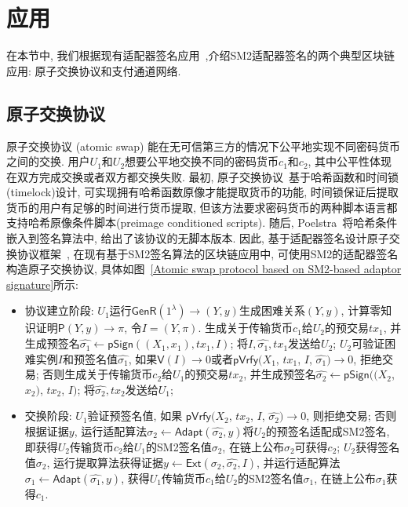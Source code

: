 \documentclass[review]{jcr}
\begin{document}
\section{应用} 

在本节中, 我们根据现有适配器签名应用~\cite{Poelstra2017,MalavoltaMSKM19,EsginEE20,AumayrEEFHMMR20},介绍SM2适配器签名的两个典型区块链应用: 原子交换协议和支付通道网络. 

\subsection{原子交换协议}

原子交换协议 (atomic swap) 能在无可信第三方的情况下公平地实现不同密码货币之间的交换. 用户$U_1$和$U_2$想要公平地交换不同的密码货币$c_1$和$c_2$, 其中公平性体现在双方完成交换或者双方都交换失败. 最初, 原子交换协议~\cite{Nolan2013}基于哈希函数和时间锁(timelock)设计, 可实现拥有哈希函数原像才能提取货币的功能, 时间锁保证后提取货币的用户有足够的时间进行货币提取, 但该方法要求密码货币的两种脚本语言都支持哈希原像条件脚本(preimage conditioned scripts). 随后, Poelstra~\cite{Poelstra2017}将哈希条件嵌入到签名算法中, 给出了该协议的无脚本版本. 因此, 基于适配器签名设计原子交换协议框架~\cite{Nolan2013,Poelstra2017,EsginEE20}, 在现有基于SM2签名算法的区块链应用中, 可使用SM2的适配器签名构造原子交换协议, 具体如图~\ref{Atomic swap protocol based on SM2-based adaptor signature}所示: 

\begin{itemize}

\item 协议建立阶段: $U_1$运行$\mathsf{GenR}(1^\lambda)\rightarrow (Y,y)$生成困难关系$(Y,y)$, 计算零知识证明$\mathsf{P}(Y,y)\rightarrow \pi$, 令$I=(Y,\pi)$. 生成关于传输货币$c_1$给$U_2$的预交易$tx_1$, 并生成预签名$\hat{\sigma_1}\leftarrow \mathsf{pSign}((X_1,x_1), tx_1, I)$; 将$I, \hat{\sigma_1}, tx_1$发送给$U_2$; $U_2$可验证困难实例$I$和预签名值$\hat{\sigma_1}$, 如果$\mathsf{V}(I)\rightarrow 0$或者$\mathsf{pVrfy}$$(X_1$, $tx_1$, $I$, $\hat{\sigma_1})$$\rightarrow 0$, 拒绝交易;  否则生成关于传输货币$c_2$给$U_1$的预交易$tx_2$, 并生成预签名$\hat{\sigma_2}$$\leftarrow$$\mathsf{pSign}$$((X_2$, $x_2)$, $tx_2$, $I)$; 将$\hat{\sigma_2},tx_2$发送给$U_1$;

\item 交换阶段: $U_1$验证预签名值, 如果 $\mathsf{pVrfy}(X_2$, $tx_2$, $I$, $\hat{\sigma_2})$$\rightarrow 0$, 则拒绝交易; 否则根据证据$y$, 运行适配算法$\sigma_2\leftarrow \mathsf{Adapt}(\hat{\sigma_2},y)$将$U_2$的预签名适配成SM2签名, 即获得$U_2$传输货币$c_2$给$U_1$的SM2签名值$\sigma_2$, 在链上公布$\sigma_2$可获得$c_2$; $U_2$获得签名值$\sigma_2$, 运行提取算法获得证据$y\leftarrow \mathsf{Ext}(\sigma_2,\hat{\sigma_2}, I)$, 并运行适配算法$\sigma_1\leftarrow \mathsf{Adapt}(\hat{\sigma_1},y)$, 获得$U_1$传输货币$c_1$给$U_2$的SM2签名值$\sigma_1$, 在链上公布$\sigma_1$获得$c_1$.
\end{itemize}
\end{document}
